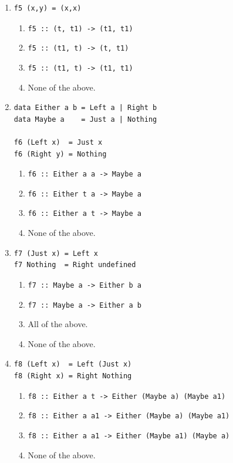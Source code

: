\documentclass[12pt]{article}
\begin{document}
\begin{enumerate}[resume]
\item \begin{verbatim}
f5 (x,y) = (x,x)
\end{verbatim}
\begin{enumerate}
\item {\tt f5 :: (t, t1) -> (t1, t1)}
\item {\tt f5 :: (t1, t) -> (t, t1)}
\item {\tt f5 :: (t1, t) -> (t1, t1)}
\item None of the above.
\end{enumerate}

\item \begin{verbatim}
data Either a b = Left a | Right b
data Maybe a    = Just a | Nothing

f6 (Left x)  = Just x
f6 (Right y) = Nothing
\end{verbatim}
\begin{enumerate}
\item {\tt f6 :: Either a a -> Maybe a}
\item {\tt f6 :: Either t a -> Maybe a}
\item {\tt f6 :: Either a t -> Maybe a}
\item None of the above.
\end{enumerate}

\item \begin{verbatim}
f7 (Just x) = Left x
f7 Nothing  = Right undefined
\end{verbatim}
\begin{enumerate}
\item {\tt f7 :: Maybe a -> Either b a}
\item {\tt f7 :: Maybe a -> Either a b}
\item All of the above.
\item None of the above.
\end{enumerate}

\item \begin{verbatim}
f8 (Left x)  = Left (Just x)
f8 (Right x) = Right Nothing
\end{verbatim}
\begin{enumerate}
\item {\tt f8 :: Either a t -> Either (Maybe a) (Maybe a1)}
\item {\tt f8 :: Either a a1 -> Either (Maybe a) (Maybe a1)}
\item {\tt f8 :: Either a a1 -> Either (Maybe a1) (Maybe a)}
\item None of the above.
\end{enumerate}


\end{enumerate}
\end{document}
